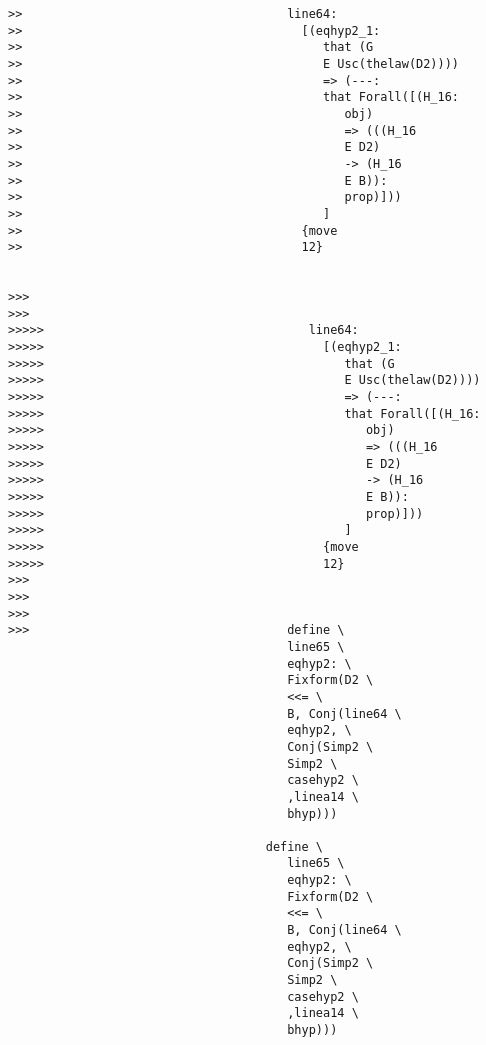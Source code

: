 \documentclass[12pt]{article}
\begin{document}
\begin{verbatim}
>>                                     line64:
>>                                       [(eqhyp2_1:
>>                                          that (G
>>                                          E Usc(thelaw(D2))))
>>                                          => (---:
>>                                          that Forall([(H_16:
>>                                             obj)
>>                                             => (((H_16
>>                                             E D2)
>>                                             -> (H_16
>>                                             E B)):
>>                                             prop)]))
>>                                          ]
>>                                       {move
>>                                       12}


>>>
>>>
>>>>>                                     line64:
>>>>>                                       [(eqhyp2_1:
>>>>>                                          that (G
>>>>>                                          E Usc(thelaw(D2))))
>>>>>                                          => (---:
>>>>>                                          that Forall([(H_16:
>>>>>                                             obj)
>>>>>                                             => (((H_16
>>>>>                                             E D2)
>>>>>                                             -> (H_16
>>>>>                                             E B)):
>>>>>                                             prop)]))
>>>>>                                          ]
>>>>>                                       {move
>>>>>                                       12}
>>>
>>>
>>>
>>>                                    define \
                                       line65 \
                                       eqhyp2: \
                                       Fixform(D2 \
                                       <<= \
                                       B, Conj(line64 \
                                       eqhyp2, \
                                       Conj(Simp2 \
                                       Simp2 \
                                       casehyp2 \
                                       ,linea14 \
                                       bhyp)))

                                    define \
                                       line65 \
                                       eqhyp2: \
                                       Fixform(D2 \
                                       <<= \
                                       B, Conj(line64 \
                                       eqhyp2, \
                                       Conj(Simp2 \
                                       Simp2 \
                                       casehyp2 \
                                       ,linea14 \
                                       bhyp)))



\end{verbatim}
\end{document}
